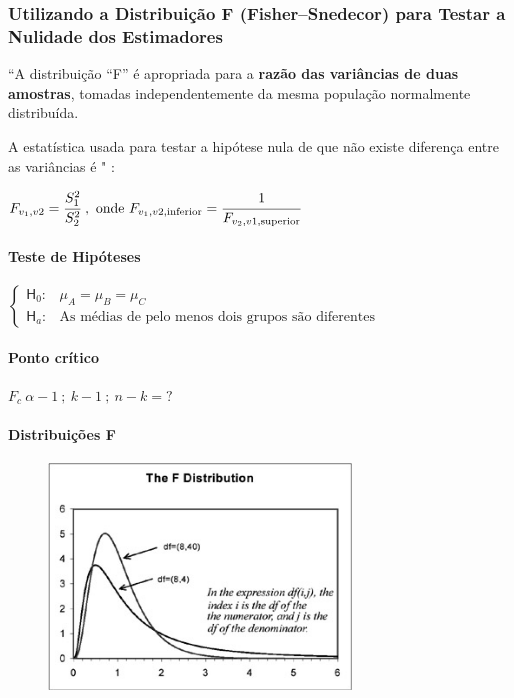 		\subsubsection{Utilizando a Distribuição F (Fisher–Snedecor) para Testar a Nulidade dos Estimadores}
	
			``A distribuição “F” é apropriada para a \textbf{razão das variâncias de duas amostras}, tomadas independentemente da mesma população normalmente distribuída.

			A estatística usada para testar a hipótese nula de que não existe diferença entre as variâncias é " \cite{torres}:
		
			{\Large $ F_{v_{1},v{2}} = \cfrac{S^{2}_{1}}{S^{2}_{2}} \ , \ \text{onde} \ F_{v_{1},v{2}, \text{inferior}} = \cfrac{1}{F_{v_{2},v{1}, \text{superior}}} $}
		
			\paragraph{Teste de Hipóteses}

				$
					\begin{cases}
			        \mathsf{H}_{0} : & \mu_{A} = \mu_{B} = \mu_{C} \\
			        \mathsf{H}_{a} : & \text{As médias de pelo menos dois grupos são diferentes}
			        \end{cases}
				$
		
			\paragraph{Ponto crítico}
		
				$ F_{c} \ \alpha - 1 \ ; \ k - 1 \ ; \ n - k = ?  $
		
			\paragraph{Distribuições F \cite{google}} \hspace{0cm}
		
				\begin{figure}[H]
					\centering			
					\includegraphics[height=6cm]{images/anova_distribuicao-f}
				\end{figure}					
					
